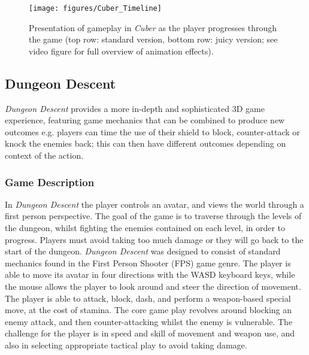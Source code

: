\documentclass{sigchi}
\begin{document}
\begin{figure}
	\texttt{[image: figures/Cuber\_Timeline]}
	\caption{Presentation of gameplay in \textit{Cuber} as the player progresses through the game (top row: standard version, bottom row: juicy version; see video figure for full overview of animation effects).}
	\label{figure:cuberjuicy}
\end{figure}

\subsection{Dungeon Descent}
\textit{Dungeon Descent} provides a more in-depth and sophisticated 3D game experience, featuring game mechanics that can be combined to produce new outcomes e.g. players can time the use of their shield to block, counter-attack or knock the enemies back; this can then have different outcomes depending on context of the action.

\subsubsection{Game Description}
In \textit{Dungeon Descent} the player controls an avatar, and views the world through a first person perspective. The goal of the game is to traverse through the levels of the dungeon, whilst fighting the enemies contained on each level, in order to progress. Players must avoid taking too much damage or they will go back to the start of the dungeon. \textit{Dungeon Descent} was designed to consist of standard mechanics found in the First Person Shooter (FPS) game genre. The player is able to move its avatar in four directions with the WASD keyboard keys, while the mouse allows the player to look around and steer the direction of movement. The player is able to attack, block, dash, and perform a weapon-based special move, at the cost of stamina. The core game play revolves around blocking an enemy attack, and then counter-attacking whilst the enemy is vulnerable. The challenge for the player is in speed and skill of movement and weapon use, and also in selecting appropriate tactical play to avoid taking damage. 
\end{document}
